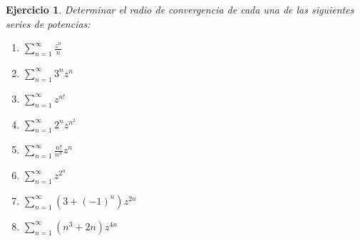 \documentclass[11pt]{report}
\newtheorem{exercise}{Ejercicio}
\theoremstyle{remark}
\begin{document}
\begin{exercise}
Determinar el radio de convergencia de cada una de las siguientes series de potencias:
\begin{enumerate}
    \item $\displaystyle \sum_{n=1}^\infty \frac{z^n}{n}$
    \item $\displaystyle \sum_{n=1}^\infty 3^nz^n$
    \item $\displaystyle \sum_{n=1}^\infty z^{n!}$
    \item $\displaystyle \sum_{n=1}^\infty 2^nz^{n^2}$
    \item $\displaystyle \sum_{n=1}^\infty \frac{n!}{n^n}z^n$
    \item $\displaystyle \sum_{n=1}^\infty z^{2^n}$
    \item $\displaystyle \sum_{n=1}^\infty (3+(-1)^n)z^{2n}$
    \item $\displaystyle \sum_{n=1}^\infty (n^3+2n)z^{4n}$
\end{enumerate}    
\end{exercise}

\pagebreak
\end{document}
